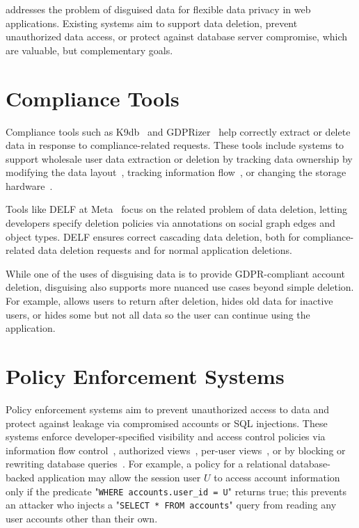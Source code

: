 \sys addresses the problem of disguised data for flexible data privacy in web
applications.
%
Existing systems aim to support data deletion, prevent unauthorized data
access, or protect against database server compromise, which are valuable, but
complementary goals.

\section{Compliance Tools}
Compliance tools such as K9db~\cite{k9db} and GDPRizer~\cite{gdprizer} help
correctly extract or delete data in response to compliance-related
requests.
%
These tools include systems to support wholesale user data extraction or deletion by tracking data
ownership by modifying the data layout~\cite{usershards, k9db}, tracking
information flow~\cite{schengendb}, or changing the
storage hardware~\cite{sdp}.
%

%
Tools like DELF at Meta~\cite{delf} focus on the related problem of data
deletion, letting developers specify deletion policies via
annotations on social graph edges and object types. DELF ensures correct
cascading data deletion, both for compliance-related data deletion requests and
for normal application deletions.
%

%
While one of the uses of disguising data is to provide GDPR-compliant account deletion, disguising
also supports more nuanced use cases beyond simple deletion. For example, \sys
allows users to return after deletion, hides old data for inactive users, or
hides some but not all data so the user can continue using the application.
%

\section{Policy Enforcement Systems}
Policy enforcement systems 
aim to prevent unauthorized access to data and protect against leakage via
compromised accounts or SQL injections. 
%
These systems enforce developer-specified
visibility and access control policies via information flow
control~\cite{static, jeeves, jif, hails, ifdb}, authorized views~\cite{oracle},
per-user views~\cite{multiverse}, or by blocking or rewriting database
queries~\cite{blockaid, qapla, sieve}.
%
For example, a policy for a relational database-backed application may allow the
session user $U$ to access account information only if the predicate "\texttt{WHERE
accounts.user\_id = U}" returns true; this prevents an attacker who injects a
"\texttt{SELECT * FROM accounts}" query from reading any user accounts other than their
own.
%

